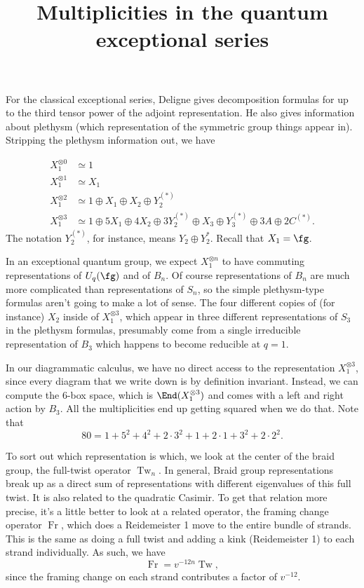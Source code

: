 \documentclass[12pt]{amsart}
\DeclareMathOperator{\Tw}{Tw}
\DeclareMathOperator{\Fr}{Fr}
\begin{document}
\title{Multiplicities in the quantum exceptional series}

For the classical exceptional series, Deligne \cite{MR1378507} gives
decomposition formulas for up to the third tensor power of the adjoint
representation. He also gives information about plethysm (which
representation of the symmetric group things appear in). Stripping
the plethysm information out, we have

\begin{align*}
  X_1^{\otimes 0} &\simeq 1\\
  X_1^{\otimes 1} &\simeq X_1\\
  X_1^{\otimes 2} &\simeq 1 \oplus X_1 \oplus X_2 \oplus Y_2^{(*)}\\
  X_1^{\otimes 3} &\simeq 1 \oplus 5X_1 \oplus 4X_2 \oplus 3Y_2^{(*)} \oplus X_3
                    \oplus Y_3^{(*)} \oplus 3A \oplus 2C^{(*)}.
\end{align*}
The notation $Y_2^{(*)}$, for instance, means $Y_2 \oplus
Y_2^*$. Recall that $X_1 = \fg$.

In an exceptional quantum group, we expect $X_1^{\otimes n}$ to have
commuting representations of $U_q(\fg)$ and of $B_n$. Of course
representations of $B_n$ are much more complicated than
representations of $S_n$, so the simple plethysm-type formulas aren't
going to make a lot of sense. The four different copies of (for instance)
$X_2$ inside of $X_1^{\otimes 3}$, which appear in three different
representations of $S_3$ in the plethysm formulas, presumably come
from a single irreducible representation of $B_3$ which happens to
become reducible at $q=1$.

In our diagrammatic calculus, we have no direct access to the
representation $X_1^{\otimes 3}$, since every diagram that we write
down is by definition invariant. Instead, we can compute the 6-box
space, which is $\End(X_1^{\otimes 3})$ and comes with a left and
right action by $B_3$. All the multiplicities end up getting squared
when we do that. Note that
\[
80 = 1 + 5^2 + 4^2 + 2\cdot 3^2 + 1 + 2\cdot 1 + 3^2 + 2\cdot 2^2.
\]

To sort out which representation is which, we look at the center of
the braid group, the full-twist operator $\Tw_n$. In general, Braid
group representations break up as a direct sum of representations with
different eigenvalues of this full twist. It is also related to the
quadratic Casimir. To get that relation more precise, it's a little
better to look at a related operator, the framing change operator
$\Fr$, which does a Reidemeister 1 move to the entire bundle of
strands. This is the same as doing a full twist and adding a kink
(Reidemeister 1) to each strand individually. As such, we have
\[
\Fr = v^{-12n} \Tw,
\]
since the framing change on each strand contributes a factor of
$v^{-12}$.
\end{document}
